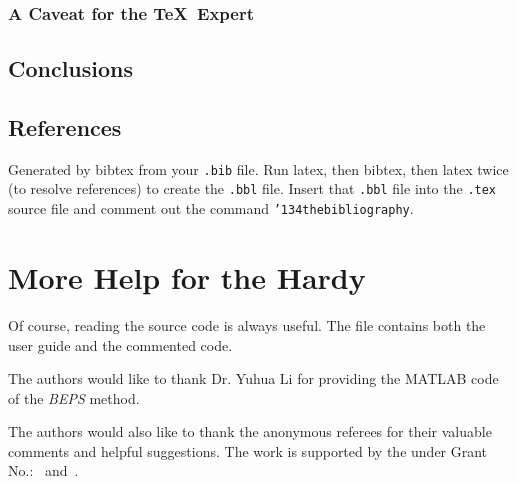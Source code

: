\subsubsection*{A Caveat for the \TeX\ Expert}
\subsection{Conclusions}
\subsection{References}
Generated by bibtex from your \texttt{.bib} file.  Run latex,
then bibtex, then latex twice (to resolve references)
to create the \texttt{.bbl} file.  Insert that \texttt{.bbl}
file into the \texttt{.tex} source file and comment out
the command \texttt{{\char'134}thebibliography}.
\section{More Help for the Hardy}

Of course, reading the source code is always useful.  The file
 contains both the user guide and the commented
code.

\begin{acks}
  The authors would like to thank Dr. Yuhua Li for providing the
  MATLAB code of the \textit{BEPS} method.

  The authors would also like to thank the anonymous referees for
  their valuable comments and helpful suggestions. The work is
  supported by the  under Grant
  No.:~
  and~.

\end{acks}
\fi%
